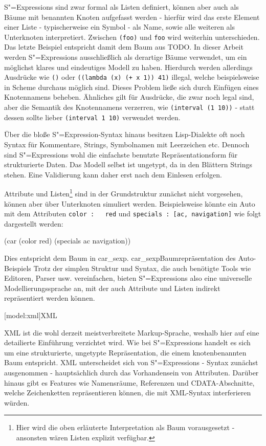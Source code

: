 \documentclass[11pt, a4paper, bibgerm]{book}
\newcommand\icode[1]{\lstinline?#1?}
\newcommand\lsection{}
\newcommand\abb{}
\newcommand\fig{}
\newcommand{\sexp}{S"=Expression}
\newcommand{\sexps}{S"=Expressions}
\begin{document}
\sexps{} sind zwar formal als Listen definiert, können aber auch als
Bäume mit benannten Knoten aufgefasst werden - hierfür wird das erste
Element einer Liste - typischerweise ein Symbol - als Name, sowie alle
weiteren als Unterknoten interpretiert. Zwischen \icode{(foo)} und
\icode{foo} wird weiterhin unterschieden. Das letzte Beispiel entspricht
damit dem Baum aus \abb{TODO}. In dieser Arbeit werden \sexps{}
ausschließlich als derartige Bäume verwendet, um ein möglichst klares
und eindeutiges Modell zu haben. Hierdurch werden allerdings Ausdrücke
wie \icode{()} oder \icode{((lambda (x) (+ x 1)) 41)} illegal, welche
beispielsweise in Scheme\cite{TODO} durchaus möglich sind. Dieses
Problem ließe sich durch Einfügen eines Knotennamens beheben. Ähnliches
gilt für Ausdrücke, die zwar noch legal sind, aber die Semantik des
Knotennamens verzerren, wie \icode{(interval (1 10))} - statt dessen
sollte lieber \icode{(interval 1 10)} verwendet werden.

Über die bloße \sexp{}-Syntax hinaus besitzen Lisp-Dialekte oft noch
Syntax für Kommentare, Strings, Symbolnamen mit Leerzeichen
etc. Dennoch sind \sexps{} wohl die einfachste benutzte
Repräsentationsform für strukturierte Daten. Das Modell selbst ist
ungetypt, da in den Blättern Strings stehen. Eine Validierung kann
daher erst nach dem Einlesen erfolgen.

Attribute und Listen\footnote{Hier wird die oben erläuterte
  Interpretation als Baum vorausgesetzt - ansonsten wären Listen
  explizit verfügbar.} sind in der Grundstruktur zunächst nicht
vorgesehen, können aber über Unterknoten simuliert
werden. Beispielsweise könnte ein Auto mit dem Attributen \icode{color :
  red} und \icode{specials : [ac, navigation]} wie folgt dargestellt
werden:
\begin{code}
(car
  (color red)
  (specials ac navigation))
\end{code}

Dies entspricht dem Baum in \abb{car_sexp}.
\fig{car_sexp}{Baumrepräsentation des Auto-Beispiels} Trotz der simplen
Struktur und Syntax, die auch benötigte Tools wie Editoren, Parser
usw. vereinfachen, bieten \sexps{} also eine universelle
Modellierungssprache an, mit der auch Attribute und Listen indirekt
repräsentiert werden können.

\lsection[model:xml]{XML}

XML ist die wohl derzeit meistverbreitete Markup-Sprache, weshalb hier
auf eine detailierte Einführung verzichtet wird. Wie bei \sexps{}
handelt es sich um eine strukturierte, ungetypte Repräsentation, die
einem knotenbenannten Baum entspricht. XML unterscheidet sich von
\sexps{} - Syntax zunächst ausgenommen - hauptsächlich durch das
Vorhandensein von Attributen. Darüber hinaus gibt es Features wie
Namensräume, Referenzen und CDATA-Abschnitte, welche Zeichenketten
repräsentieren können, die mit XML-Syntax interferieren würden.
\end{document}
